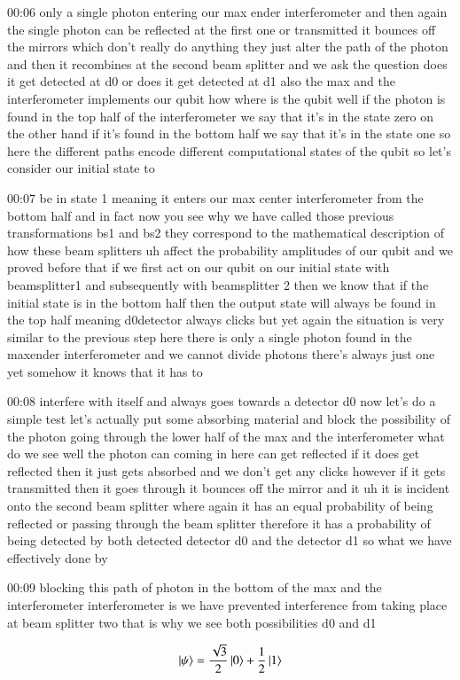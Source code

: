 00:06
only a single photon entering our max ender interferometer
and then again the single photon can be reflected at the first one or
transmitted it bounces off the mirrors which don't
really do anything they just alter the path of the photon
and then it recombines at the second beam splitter and we ask the question
does it get detected at d0 or does it get detected at d1
also the max and the interferometer implements our qubit how where is the qubit
well if the photon is found in the top half
of the interferometer we say that it's in the state zero
on the other hand if it's found in the bottom half we say that it's in the
state one so here the different paths encode different
computational states of the qubit so let's consider our initial state to

00:07
be in state 1 meaning it enters our max center
interferometer from the bottom half and in fact now you see why we have
called those previous transformations bs1 and bs2 they
correspond to the mathematical description of how these beam splitters uh
affect the probability amplitudes of our qubit and we proved before that
if we first act on our qubit on our initial state
with beamsplitter1 and subsequently with beamsplitter 2
then we know that if the initial state is in the bottom half
then the output state will always be found in the top half
meaning d0detector always clicks but yet again the situation is very
similar to the previous step here there is only a single photon found
in the maxender interferometer and we cannot divide
photons there's always just one yet somehow it knows that it has to

00:08
interfere with itself and always goes towards a detector d0
now let's do a simple test let's actually put some absorbing material
and block the possibility of the photon going through the lower half of the max
and the interferometer what do we see well the photon can
coming in here can get reflected if it does get reflected
then it just gets absorbed and we don't get any clicks
however if it gets transmitted then it goes through it bounces off the mirror
and it uh it is incident onto the second beam splitter
where again it has an equal probability of being reflected or passing through
the beam splitter therefore it has a probability of being detected by both
detected detector d0 and the detector d1 so what we have effectively done by

00:09
blocking this path of photon in the bottom of the max and the interferometer
interferometer is we have prevented interference from taking place
at beam splitter two that is why we see both possibilities d0 and d1


\newpage
\begin{exercises}
\begin{equation*}
\ket{\psi} = \frac{\sqrt{3}}{2}\ket{0} + \frac{1}{2}\ket{1}
\end{equation*}


\end{exercises}

